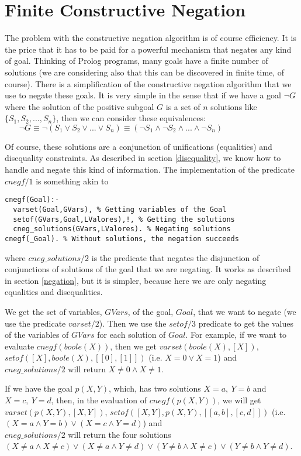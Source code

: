 \documentclass{llncs}
\begin{document}
\section{Finite Constructive Negation}
\label{cnegf}

The problem with the constructive negation algorithm is of course
efficiency. It is the price that it has to be paid for a powerful
mechanism that negates any kind of goal. Thinking of Prolog programs,
many goals have a finite number of solutions (we are considering also
that this can be discovered in finite time, of course). There is a
simplification of the constructive negation algorithm that we use to
negate these goals. It is very simple in the sense that if we have a
goal $\neg G$ where the solution of the positive subgoal $G$ is a set
of $n$ solutions like $\{S_1, S_2,...,S_n\}$, then we can consider
these equivalences: %
$~~~~~~~~\neg G \equiv \neg(S_1 \vee S_2 \vee ... \vee S_n) 
 \equiv (\neg S_1 \wedge \neg S_2 \wedge ... \wedge \neg S_n)$

Of course, these solutions are a conjunction of unifications
(equalities) and disequality constraints. As described in section
\ref{disequality}, we know how to handle and negate this kind of
information. The implementation of the predicate $cnegf/1$ is
something akin to

{\small
\begin{verbatim}
cnegf(Goal):-
  varset(Goal,GVars), % Getting variables of the Goal
  setof(GVars,Goal,LValores),!, % Getting the solutions
  cneg_solutions(GVars,LValores). % Negating solutions
cnegf(_Goal). % Without solutions, the negation succeeds
\end{verbatim}
}
\noindent
where $cneg\_solutions/2$ is the predicate that negates the disjunction
of conjunctions of solutions of the goal that we are negating. It
works as described in section \ref{negation}, but it is simpler,
because here we are only negating equalities and disequalities.

We get the set of variables, $GVars$, of the goal, $Goal$, that we
want to negate (we use the predicate $varset/2$). Then we use the
$setof/3$ predicate to get the values of the variables of $GVars$
 for each solution of $Goal$. For example, if we want to
evaluate $cnegf(boole(X))$, then we get $varset(boole(X),[X])$,
$setof([X],boole(X),[[0],[1]])$ (i.e. $X=0 \vee X=1$) and
$cneg\_solutions/2$ will return $X \neq 0
\wedge X \neq 1$. 

If we have the goal $p(X,Y)$, which, has two solutions $X=a,~Y=b$ and
$X=c,~Y=d$, then, in the evaluation of $cnegf(p(X,Y))$, we will get
$varset(p(X,Y),[X,Y])$, $setof([X,Y],p(X,Y),[[a,b],[c,d]])$
(i.e. $(X=a \wedge Y=b) \vee (X=c \wedge Y=d)$) and \\$cneg\_solutions/2$
will return the four solutions $(X \neq a \wedge X \neq c) \vee (X
\neq a \wedge Y \neq d) \vee (Y \neq b \wedge X \neq c) \vee (Y \neq b
\wedge Y \neq d)$.
\end{document}
